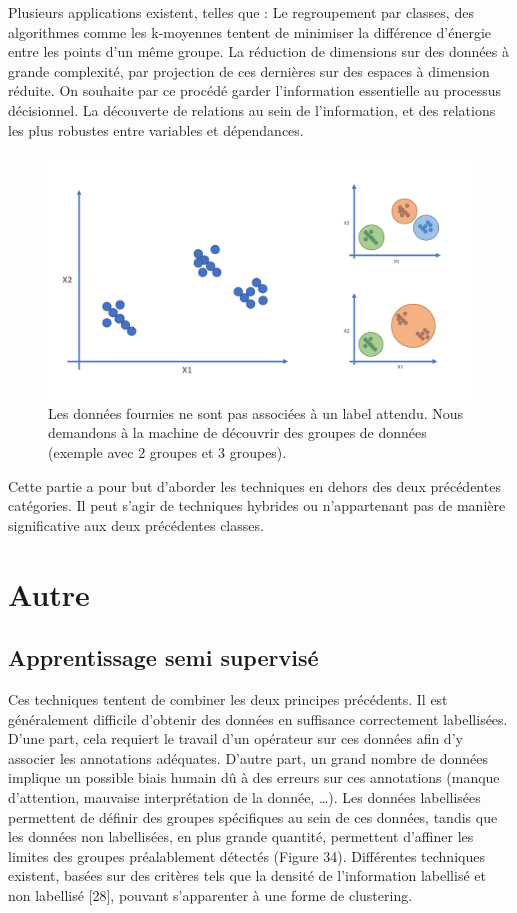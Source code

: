 Plusieurs applications existent, telles que :
	Le regroupement par classes, des algorithmes comme les k-moyennes tentent de minimiser la différence d’énergie entre les points d’un même groupe.
	La réduction de dimensions sur des données à grande complexité, par projection de ces dernières sur des espaces à dimension réduite. On souhaite par ce procédé garder l’information essentielle au processus décisionnel.
	La découverte de relations au sein de l’information, et des relations les plus robustes entre variables et dépendances.
 
\begin{figure}[H]
    \centering
    \includegraphics[width=\linewidth]{contents/chapter_3/resources/Unsupervised.pdf}
    \caption{Les données fournies ne sont pas associées à un label attendu. Nous demandons à la machine de découvrir des groupes de données (exemple avec 2 groupes et 3 groupes).}
    \label{fig:chapter_3:unsupervised}
\end{figure}

Cette partie a pour but d’aborder les techniques en dehors des deux précédentes catégories. Il peut s’agir de techniques hybrides ou n’appartenant pas de manière significative aux deux précédentes classes. 

\section{Autre}
\subsection{Apprentissage semi supervisé}
Ces techniques tentent de combiner les deux principes précédents. Il est généralement difficile d’obtenir des données en suffisance correctement labellisées. D’une part, cela requiert le travail d’un opérateur sur ces données afin d’y associer les annotations adéquates. D’autre part, un grand nombre de données implique un possible biais humain dû à des erreurs sur ces annotations (manque d’attention, mauvaise interprétation de la donnée, …).
Les données labellisées permettent de définir des groupes spécifiques au sein de ces données, tandis que les données non labellisées, en plus grande quantité, permettent d’affiner les limites des groupes préalablement détectés (Figure 34). Différentes techniques existent, basées sur des critères tels que la densité de l’information labellisé et non labellisé [28], pouvant s’apparenter à une forme de clustering.
 
